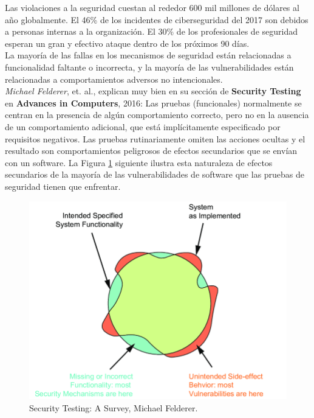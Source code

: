 Las violaciones a la seguridad cuestan al rededor 600 mil millones de dólares al año globalmente\cite{mcafeecsis}. El 46\% de los incidentes de ciberseguridad del 2017 son debidos a personas internas a la organización\cite{kasperskyHumanFactor}. El 30\% de los profesionales de seguridad esperan un gran y efectivo ataque dentro de los próximos 90 días.\cite{theeconomistCyberChasm}\\

La mayoría de las fallas en los mecanismos de seguridad están relacionadas a funcionalidad faltante o incorrecta, y la mayoría de las vulnerabilidades están relacionadas a comportamientos adversos no intencionales. \\

\textit{Michael Felderer}, et. al., explican muy bien en su sección de \textbf{Security Testing}\cite{FELDERER20161} en \textbf{Advances in Computers}, 2016:
Las pruebas (funcionales) normalmente se centran en la presencia de algún comportamiento correcto, pero no en la ausencia de un comportamiento adicional, que está implícitamente especificado por requisitos negativos. Las pruebas rutinariamente omiten las acciones ocultas y el resultado son comportamientos peligrosos de efectos secundarios que se envían con un software. La Figura \ref{fig:functionality side-effects} siguiente ilustra esta naturaleza de efectos secundarios de la mayoría de las vulnerabilidades de software que las pruebas de seguridad tienen que enfrentar\cite{FELDERER20161}.\\

\begin{figure}[ht]
    \centering
    \includegraphics[scale=0.35]{images/functionality.png}
    \caption{Security Testing: A Survey, Michael Felderer.}
    \label{fig:functionality side-effects}
\end{figure}

